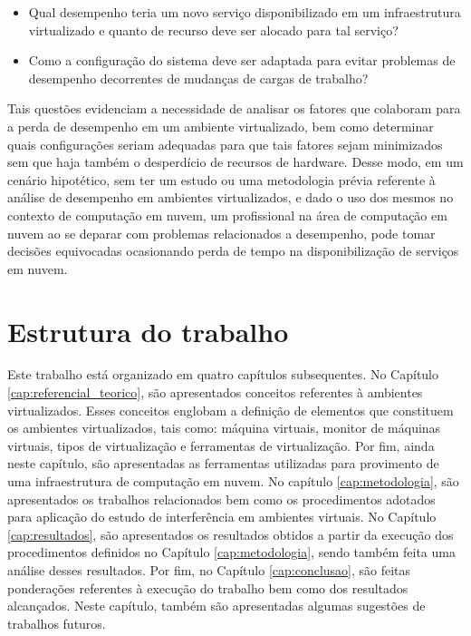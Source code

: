 \begin{itemize}
  \item Qual desempenho teria um novo serviço disponibilizado em um infraestrutura virtualizado e quanto de recurso deve ser alocado para tal serviço?

  \item Como a configuração do sistema deve ser adaptada para evitar problemas de desempenho decorrentes de mudanças de cargas de trabalho?
\end{itemize}


Tais questões evidenciam a necessidade de analisar os fatores que colaboram para a perda de desempenho em um ambiente virtualizado, bem como determinar quais configurações seriam adequadas para que tais fatores sejam minimizados sem que haja também o desperdício de recursos de hardware. Desse modo, em um cenário hipotético, sem ter um estudo ou uma metodologia prévia referente à análise de desempenho em ambientes virtualizados, e dado o uso dos mesmos no contexto de computação em nuvem, um profissional na área de computação em nuvem ao se deparar com problemas relacionados a desempenho, pode tomar decisões equivocadas ocasionando perda de tempo na disponibilização de serviços em nuvem.


\section{Estrutura do trabalho}
Este trabalho está organizado em quatro capítulos subsequentes. No Capítulo \ref{cap:referencial_teorico}, são apresentados conceitos referentes à ambientes virtualizados. Esses conceitos englobam a definição de elementos que constituem os ambientes virtualizados, tais como: máquina virtuais, monitor de máquinas virtuais, tipos de virtualização e ferramentas de virtualização. Por fim, ainda neste capítulo, são apresentadas as ferramentas utilizadas para provimento de uma infraestrutura de computação em nuvem. No capítulo \ref{cap:metodologia}, são apresentados os trabalhos relacionados bem como os procedimentos adotados para aplicação do estudo de interferência em ambientes virtuais. No Capítulo \ref{cap:resultados}, são apresentados os resultados obtidos a partir da execução dos procedimentos definidos no Capítulo \ref{cap:metodologia}, sendo também feita uma análise desses resultados. Por fim, no Capítulo \ref{cap:conclusao}, são feitas ponderações referentes à execução do trabalho bem como dos resultados alcançados. Neste capítulo, também são apresentadas algumas sugestões de trabalhos futuros.


